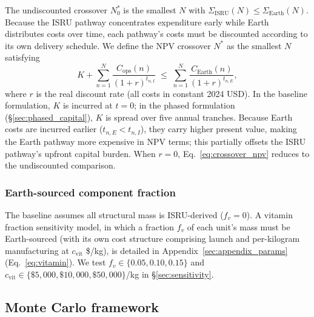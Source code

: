 \documentclass[preprint,12pt]{elsarticle}
\begin{document}
The undiscounted crossover $N^*_0$ is the smallest $N$ with $\Sigma_{\mathrm{ISRU}}(N) \leq \Sigma_{\mathrm{Earth}}(N)$. Because the ISRU pathway concentrates expenditure early while Earth distributes costs over time, each pathway's costs must be discounted according to its own delivery schedule. We define the NPV crossover $N^*$ as the smallest $N$ satisfying
\begin{equation}
  K + \sum_{n=1}^{N} \frac{C_{\mathrm{ops}}(n)}{(1+r)^{t_{n,I}}} \;\leq\; \sum_{n=1}^{N} \frac{C_{\mathrm{Earth}}(n)}{(1+r)^{t_{n,E}}},
  \label{eq:crossover_npv}
\end{equation}
where $r$ is the real discount rate (all costs in constant 2024 USD). In the baseline formulation, $K$ is incurred at $t = 0$; in the phased formulation (\S\ref{sec:phased_capital}), $K$ is spread over five annual tranches. Because Earth costs are incurred earlier ($t_{n,E} < t_{n,I}$), they carry higher present value, making the Earth pathway more expensive in NPV terms; this partially offsets the ISRU pathway's upfront capital burden. When $r = 0$, Eq.~\ref{eq:crossover_npv} reduces to the undiscounted comparison.

\subsubsection{Earth-sourced component fraction}
\label{sec:vitamin}

The baseline assumes all structural mass is ISRU-derived ($f_v = 0$). A vitamin fraction sensitivity model, in which a fraction $f_v$ of each unit's mass must be Earth-sourced (with its own cost structure comprising launch and per-kilogram manufacturing at $c_{\mathrm{vit}}$ \$/kg), is detailed in Appendix~\ref{sec:appendix_params} (Eq.~\ref{eq:vitamin}). We test $f_v \in \{0.05, 0.10, 0.15\}$ and $c_{\mathrm{vit}} \in \{\$5{,}000, \$10{,}000, \$50{,}000\}$/kg in \S\ref{sec:sensitivity}.

\subsection{Monte Carlo framework}
\end{document}
